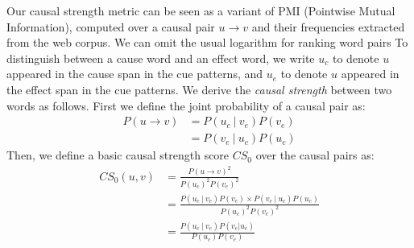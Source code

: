 Our causal strength metric can be seen as a variant of
PMI (Pointwise Mutual Information), computed over a causal pair $u \rightarrow
v$ and their frequencies extracted from the web corpus. We can omit the
usual logarithm for ranking word pairs \cite{Washtell09:CWW}
To distinguish between a cause word and
an effect word, we write $u_c$ to denote $u$ appeared in the 
cause span in the cue patterns, and $u_e$ to denote $u$ appeared 
in the effect span in the cue patterns.
We derive the {\em causal strength} between two words as follows.
First we define the joint probability of a causal pair as:
\begin{align}
P(u \rightarrow v) &= P(u_c~|~v_e)P(v_e) \nonumber \\
 &= P(v_e~|~u_c)P(u_c) \label{eq:joint}
\end{align}
Then, we define a basic causal strength score $CS_0$ over the causal pairs as:
\begin{align}
CS_0 (u,v) &= \frac{P(u \rightarrow v)^2}{P(u_c)^2 P(v_e)^2} \nonumber\\
 &= \frac{P(u_c ~|~ v_e)P(v_e) \times P(v_e~|~u_c)P(u_c)}{P(u_c)^2 P(v_e)^2} \nonumber\\
 &= \frac{P(u_c ~|~ v_e)P(v_e | u_c)}{P(u_c)P(v_e)}
\label{eq:pmi2}
\end{align}


